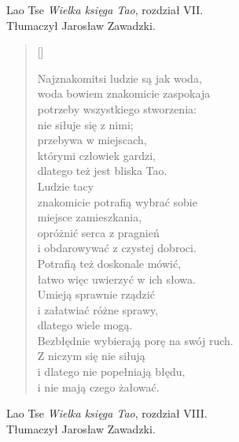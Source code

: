 \documentclass[a4paper,11pt]{article}
\newcommand{\attribB}[1]{#1}
\begin{document}
\attribB{Lao Tse \emph{Wielka księga Tao}, rozdział VII. \\
  Tłumaczył Jarosław Zawadzki.}

\vspace{\spaceThree}



\settowidth{\versewidth}{Najznakomitsi ludzie są jak woda,}

\begin{verse}[\versewidth]

  Najznakomitsi ludzie są jak woda, \\
  woda bowiem znakomicie zaspokaja \\
  potrzeby wszystkiego stworzenia: \\
  nie siłuje się z nimi; \\
  przebywa w miejscach, \\
  którymi człowiek gardzi, \\
  dlatego też jest bliska Tao. \\
  Ludzie tacy \\
  znakomicie potrafią wybrać sobie \\
  miejsce zamieszkania, \\
  opróżnić serca z pragnień \\
  i obdarowywać z czystej dobroci. \\
  Potrafią też doskonale mówić, \\
  łatwo więc uwierzyć w ich słowa. \\
  Umieją sprawnie rządzić \\
  i załatwiać różne sprawy, \\
  dlatego wiele mogą. \\
  Bezbłędnie wybierają porę na swój ruch. \\
  Z niczym się nie siłują \\
  i dlatego nie popełniają błędu, \\
  i nie mają czego żałować.

\end{verse}


\attribB{Lao Tse \emph{Wielka księga Tao}, rozdział VIII. \\
  Tłumaczył Jarosław Zawadzki.}

\vspace{\spaceThree}



\settowidth{\versewidth}{Jeśli zgromadzisz majątek i zbierzesz
  zaszczyty}
\end{document}
